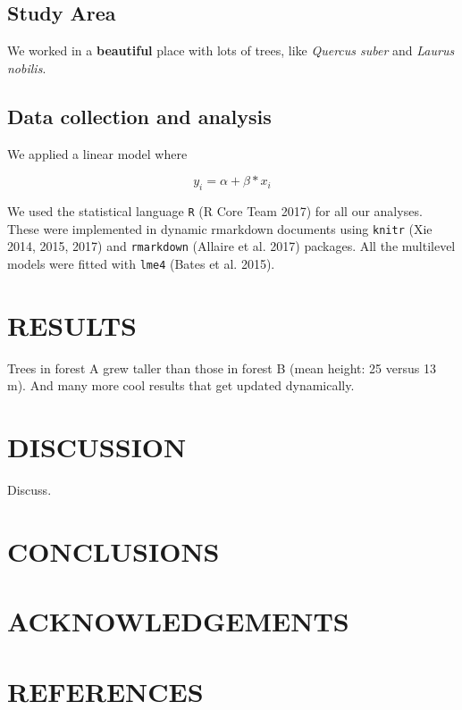 \documentclass[11pt,a4paper]{article}
\begin{document}
\subsection{Study Area}\label{study-area}

We worked in a \textbf{beautiful} place with lots of trees, like
\emph{Quercus suber} and \emph{Laurus nobilis}.

\subsection{Data collection and
analysis}\label{data-collection-and-analysis}

We applied a linear model where

\[
y_{i} = \alpha + \beta*x_{i} 
\]

We used the statistical language \texttt{R} (R Core Team 2017) for all
our analyses. These were implemented in dynamic rmarkdown documents
using \texttt{knitr} (Xie 2014, 2015, 2017) and \texttt{rmarkdown}
(Allaire et al. 2017) packages. All the multilevel models were fitted
with \texttt{lme4} (Bates et al. 2015).

\section{RESULTS}\label{results}

Trees in forest A grew taller than those in forest B (mean height: 25
versus 13 m). And many more cool results that get updated dynamically.

\section{DISCUSSION}\label{discussion}

Discuss.

\section{CONCLUSIONS}\label{conclusions}

\section{ACKNOWLEDGEMENTS}\label{acknowledgements}

\section{REFERENCES}\label{references}
\end{document}
